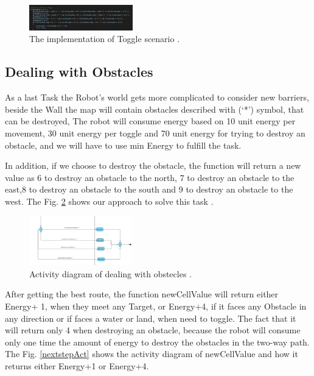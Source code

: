 \documentclass[conference]{IEEEtran}
\begin{document}
\begin{figure}[!h]
	
	\centering
	\includegraphics[width=0.4\textwidth]{ToggleCode.png}
	\caption{\label{ToggleCode}The implementation of Toggle scenario  .}
	
\end{figure}


\subsection{ Dealing with Obstacles}

As a last Task the Robot's world gets more complicated to consider new barriers, beside the Wall the map will contain  obstacles described with  (‘*’) symbol, that can be destroyed, The robot will consume  energy based on  10 unit energy per movement,  30 unit energy per toggle and  70 unit energy for trying to destroy an obstacle, and we will have to use min Energy to fulfill the task. 

In addition, if we choose to destroy the  obstacle, the function will return a new value as  6 to  destroy an obstacle to the north, 7 to destroy an obstacle to the east,8 to destroy an obstacle to the south and  9 to destroy an obstacle to the west. The Fig. \ref{ObstAct} shows our approach to solve this task .

\begin{figure}[!h]
	
	\centering
	\includegraphics[width=0.4\textwidth]{Obstecles.png}
	\caption{\label{ObstAct}Activity diagram of dealing with obstecles  .}
	
\end{figure}


After getting the best route, the function newCellValue will return either Energy+ 1, when they meet any Target, or Energy+4, if  it faces any Obstacle in any direction or if faces a water or land, when need to toggle. The fact that it will return only 4 when destroying an obstacle, because the robot will consume only one time the amount of energy to destroy the obstacles in  the two-way path. The Fig.   \ref{nextstepAct} shows the activity diagram of newCellValue and how it returns either Energy+1 or Energy+4. 
\end{document}
